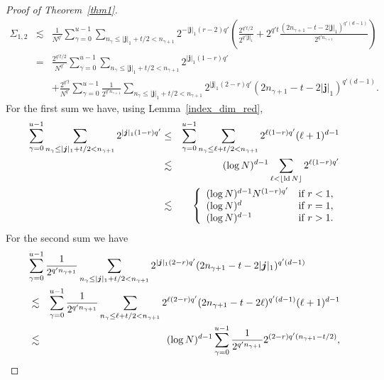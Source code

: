 \documentclass[12pt, a4paper]{article}
\newcommand{\ld}{{\rm ld}\,}
\newcommand{\nicolas}[1]{\begingroup\color{teal}#1\endgroup}
\newcommand{\bsj}{{\boldsymbol{j}}}
\begin{document}
\begin{proof}[Proof of Theorem~\ref{thm1}]
\begin{eqnarray*}
\Sigma_{1,2} & \lesssim & \frac{1}{N^{q'}} \sum_{\gamma=0}^{u-1} \sum_{n_{\gamma} \le |\bsj|_1+t/2 < n_{\gamma+1}}  2^{-|\bsj|_1 (r-2) q'} \left(\frac{2^{q't/2}}{2^{q' |\bsj|_1}} + 2^{q't} \frac{(2n_{\gamma+1} - t - 2|\bsj|_1)^{q'(d-1)}}{2^{q' n_{\gamma+1}}}\right)\\
& = & \frac{2^{q' t/2}}{N^{q'}} \sum_{\gamma=0}^{u-1} \sum_{n_{\gamma} \le |\bsj|_1+t/2 < n_{\gamma+1}}  2^{|\bsj|_1 (1-r) q'} \\
& & + \frac{2^{q' t}}{N^{q'}} \sum_{\gamma=0}^{u-1} \frac{1}{2^{q' n_{\gamma+1}}} \sum_{n_{\gamma} \le |\bsj|_1+t/2 < n_{\gamma+1}}  2^{|\bsj|_1 (2-r) q'} (2n_{\gamma+1} - t - 2|\bsj|_1)^{q'(d-1)}.
\end{eqnarray*}
For the first sum we have, using Lemma~\ref{index_dim_red},
\begin{eqnarray*}
\sum_{\gamma=0}^{u-1} \sum_{n_{\gamma} \le |\bsj|_1+t/2 < n_{\gamma+1}}  2^{|\bsj|_1 (1-r) q'} & \le &  \sum_{\gamma=0}^{u-1} \sum_{n_{\gamma} \le \ell+t/2 < n_{\gamma+1}} 2^{\ell(1-r) q'} (\ell+1)^{d-1}\\
& \lesssim & (\log N)^{d-1} \sum_{\ell < \lfloor\ld N\rfloor}  2^{\ell(1-r) q'}\\
& \lesssim & \left\{
\begin{array}{ll}
(\log N)^{d-1} N^{(1-r) q'} & \mbox{if } r<1,\\
(\log N)^d & \mbox{if } r=1,\\
(\log N)^{d-1} & \mbox{if } r>1.
\end{array}\right.
\end{eqnarray*}
For the second sum we have %
\begin{eqnarray*}
\lefteqn{\sum_{\gamma=0}^{u-1} \frac{1}{2^{q' n_{\gamma+1}}} \sum_{n_{\gamma} \le |\bsj|_1+t/2 < n_{\gamma+1}}  2^{|\bsj|_1 (2-r) q'} (2n_{\gamma+1} - t - 2|\bsj|_1)^{q'(d-1)}}\\
& \lesssim & \sum_{\gamma=0}^{u-1} \frac{1}{2^{q' n_{\gamma+1}}} \sum_{n_{\gamma} \le \ell+t/2 < n_{\gamma+1}}  2^{\ell (2-r) q'} (2n_{\gamma+1} - t - 2 \ell)^{q'(d-1)} (\ell+1)^{d-1}\\
& \lesssim & (\log N)^{d-1}  \sum_{\gamma=0}^{u-1} \frac{1}{2^{q' n_{\gamma+1}}} 2^{(2-r)q'(n_{\gamma+1}-t/2)}, 

\end{eqnarray*}
\end{proof}
\end{document}
